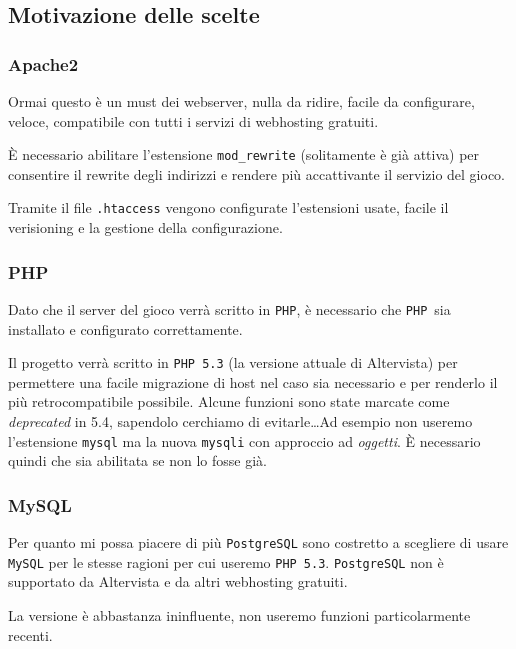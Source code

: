 \documentclass[10pt,a4paper]{article}
\newcommand{\lang}[1]{\texttt{#1}}
\newcommand{\PHP}{\lang{PHP}}
\newcommand{\pack}[1]{\texttt{#1}}
\begin{document}
\subsection{Motivazione delle scelte}
\subsubsection*{Apache2}
Ormai questo è un must dei webserver, nulla da ridire, facile da configurare, veloce, compatibile con tutti i servizi di webhosting gratuiti. 

È necessario abilitare l'estensione \pack{mod\_rewrite} (solitamente è già attiva) per consentire il rewrite degli indirizzi e rendere più accattivante il servizio del gioco.

Tramite il file \texttt{.htaccess} vengono configurate l'estensioni usate, facile il verisioning e la gestione della configurazione.

\subsubsection*{PHP}
Dato che il server del gioco verrà scritto in \PHP, è necessario che \PHP\ sia installato e configurato correttamente. 

Il progetto verrà scritto in \pack{PHP 5.3} (la versione attuale di Altervista) per permettere una facile migrazione di host nel caso sia necessario e per renderlo il più retrocompatibile possibile. Alcune funzioni sono state marcate come \emph{deprecated} in 5.4, sapendolo cerchiamo di evitarle\dots Ad esempio non useremo l'estensione \texttt{mysql} ma la nuova \texttt{mysqli} con approccio ad \emph{oggetti}. È necessario quindi che sia abilitata se non lo fosse già.

\subsubsection*{MySQL}
Per quanto mi possa piacere di più \pack{PostgreSQL} sono costretto a scegliere di usare \pack{MySQL} per le stesse ragioni per cui useremo \pack{PHP 5.3}. \pack{PostgreSQL} non è supportato da Altervista e da altri webhosting gratuiti. 

La versione è abbastanza ininfluente, non useremo funzioni particolarmente recenti.
\end{document}
